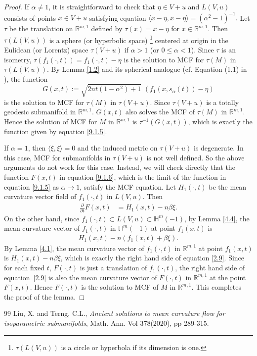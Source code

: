 \documentclass[10pt,a4paper]{amsart}
\begin{document}
\begin{proof}
If $\alpha \neq 1$, it is straightforward to check that $\eta \in V + u$ and $L(V, u)$ consists of points $x \in V+u$ satisfying equation
$ \langle x-\eta, x-\eta\rangle = (\alpha^2-1)^{-1}. $
Let $\tau$ be the translation on $\mathbb R^{m,1}$ defined by $\tau(x)=x-\eta$ for $x\in \mathbb R^{m,1}$.
Then $\tau(L(V, u))$ is a sphere (or hyperbolic space)  \footnote{$\tau(L(V, u))$ is a circle or hyperbola if its dimension is one.}
centered at origin in the Eulidean (or Lorentz) space
$\tau(V+u)$ if $\alpha > 1$ (or $0 \leq \alpha < 1$).
Since $\tau$ is an isometry, $\tau(f_{1}(\cdot,t))=f_{1}(\cdot,t)-\eta$ is the solution to MCF for $\tau(M)$ in $\tau(L(V,u))$. By Lemma \ref{1.2}  and its spherical analogue (cf. Equation (1.1) in \cite{X.C}), the function
\[ G(x, t) := \sqrt{2nt(1-\alpha^2)+1}\, \, (f_1(x,s_{\alpha}(t))-\eta)\]
 is the solution to MCF for $\tau(M)$ in $\tau(V+u)$. Since $\tau(V+u)$ is a totally geodesic submanifold in $\mathbb R^{m,1}$. $G(x, t)$ also solves the MCF of $\tau(M)$ in $\mathbb R^{m,1}$.
 Hence the solution of MCF for $M$ in $\mathbb R^{m,1}$ is $\tau^{-1}(G(x,t))$, which is exactly the
 function given by equation \eqref{9.1.5}.

If $\alpha=1$, then $\langle \xi, \xi \rangle =0$ and the induced metric on $\tau(V+u)$ is degenerate. In this case, MCF for submanifolds in $\tau(V+u)$ is not well defined. So the above arguments do not work for this case.
Instead, we will check directly that the function $F(x, t)$ in equation \eqref{9.1.6}, which is the limit of the function in
equation \eqref{9.1.5} as $\alpha \rightarrow 1$, satisfy the MCF equation.
Let $H_1(\cdot,t)$ be the mean curvature vector field of $f_1(\cdot,t)$ in $L(V,u)$. Then
\begin{align}
\frac{\partial}{\partial t}F(x,t)
&=H_{1}(x,t)-n\beta\xi.\label{2.9}
\end{align}
On the other hand, since $f_1(\cdot ,t)\subset L(V,u) \subset \mathbb{H}^{m}(-1)$,
by Lemma \ref{4.4}, the mean curvature vector of $f_1(\cdot ,t)$ in $\mathbb{H}^{m}(-1)$ at point $f_1(x,t)$ is
		 \begin{align*}
		 	H_1(x,t) -n(f_1(x,t)+\beta \xi).
		 \end{align*}
By Lemma \ref{4.1},
the mean curvature vector of $f_1(\cdot ,t)$ in $\mathbb R^{m,1}$ at point $f_1(x,t)$ is
$ H_1(x,t)- n \beta \xi$,
which is exactly the right hand side of equation \eqref{2.9}.
Since for each fixed $t$, $F(\cdot, t)$ is just a translation of $f_{1}(\cdot, t)$,
the right hand side of equation~\eqref{2.9} is also the mean curvature vector of
$F(\cdot,t)$  in $\mathbb R^{m,1}$ at the point $F(x,t)$.
Hence $F(\cdot, t)$ is the solution to MCF of $M$ in $\mathbb R^{m,1}$.
This completes the proof of the lemma.
\end{proof}

\begin{thebibliography}{99}
 Liu, X. and Terng, C.L., {\it Ancient solutions to mean curvature flow for isoparametric submanifolds}, Math. Ann. Vol 378(2020), pp 289-315.
\end{thebibliography}
\end{document}
